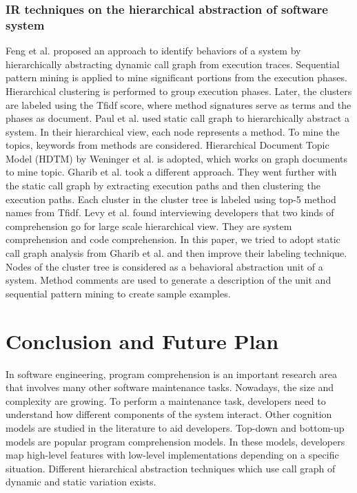 \subsubsection{IR techniques on the hierarchical abstraction of software system}
Feng et al. \cite{feng2018hierarchicalExecutionComprehension} proposed an approach to identify behaviors of a system by hierarchically abstracting dynamic call graph from execution traces. Sequential pattern mining is applied to mine significant portions from the execution phases. Hierarchical clustering is performed to group execution phases. Later, the clusters are labeled using the Tfidf score, where method signatures serve as terms and the phases as document. 
Paul et al. \cite{mcburney2014improvingTopicSummarize} used static call graph to hierarchically abstract a system. In their hierarchical view, each node represents a method. To mine the topics, keywords from methods are considered. Hierarchical Document Topic Model (HDTM) by \cite{weninger2012documentTopicHierarchies} Weninger et al. is adopted, which works on graph documents to mine topic. Gharib et al. \cite{gharibi2018automaticStaticCluster} took a different approach. They went further with the static call graph by extracting execution paths and then clustering the execution paths. Each cluster in the cluster tree is labeled using top-5 method names from Tfidf. Levy et al. \cite{levy2019understandingLargeHierarchical} found interviewing developers that two kinds of comprehension go for large scale hierarchical view. They are system comprehension and code comprehension. In this paper, we tried to adopt static call graph analysis from Gharib et al. and then improve their labeling technique. Nodes of the cluster tree is considered as a behavioral abstraction unit of a system. Method comments are used to generate a description of the unit and sequential pattern mining to create sample examples. 
\section{Conclusion and Future Plan}
In software engineering, program comprehension is an important research area that involves many other software maintenance tasks. Nowadays, the size and complexity are growing. To perform a maintenance task, developers need to understand how different components of the system interact. Other cognition models are studied in the literature to aid developers. Top-down and bottom-up models are popular program comprehension models. In these models, developers map high-level features with low-level implementations depending on a specific situation. Different hierarchical abstraction techniques which use call graph of dynamic and static variation exists. 

